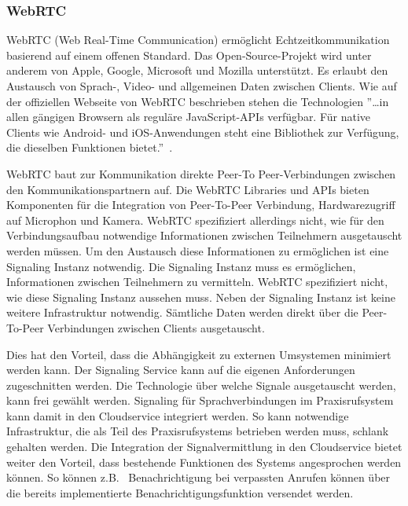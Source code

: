 \subsubsection{WebRTC}

WebRTC (Web Real-Time Communication) ermöglicht Echtzeitkommunikation basierend auf einem offenen Standard.
Das Open-Source-Projekt wird unter anderem von Apple, Google, Microsoft und Mozilla unterstützt.
Es erlaubt den Austausch von Sprach-, Video- und allgemeinen Daten zwischen Clients.
Wie auf der offiziellen Webseite von WebRTC beschrieben stehen die Technologien
''\ldots in allen gängigen Browsern als reguläre JavaScript-APIs verfügbar.
Für native Clients wie Android- und iOS-Anwendungen steht eine Bibliothek zur Verfügung, die dieselben Funktionen bietet.''~\cite{webrtc}.

WebRTC baut zur Kommunikation direkte Peer-To Peer-Verbindungen zwischen den Kommunikationspartnern auf.
Die WebRTC Libraries und APIs bieten Komponenten für die Integration von Peer-To-Peer Verbindung, Hardwarezugriff auf Microphon und Kamera.
WebRTC spezifiziert allerdings nicht, wie für den Verbindungsaufbau notwendige Informationen zwischen Teilnehmern ausgetauscht werden müssen.
Um den Austausch diese Informationen zu ermöglichen ist eine Signaling Instanz notwendig.
Die Signaling Instanz muss es ermöglichen, Informationen zwischen Teilnehmern zu vermitteln.
WebRTC spezifiziert nicht, wie diese Signaling Instanz aussehen muss.
Neben der Signaling Instanz ist keine weitere Infrastruktur notwendig.
Sämtliche Daten werden direkt über die Peer-To-Peer Verbindungen zwischen Clients ausgetauscht.

Dies hat den Vorteil, dass die Abhängigkeit zu externen Umsystemen minimiert werden kann.
Der Signaling Service kann auf die eigenen Anforderungen zugeschnitten werden.
Die Technologie über welche Signale ausgetauscht werden, kann frei gewählt werden.
Signaling für Sprachverbindungen im Praxisrufsystem kann damit in den Cloudservice integriert werden.
So kann notwendige Infrastruktur, die als Teil des Praxisrufsystems betrieben werden muss, schlank gehalten werden.
Die Integration der Signalvermittlung in den Cloudservice bietet weiter den Vorteil, dass bestehende Funktionen des Systems angesprochen werden können.
So können z.B. \ Benachrichtigung bei verpassten Anrufen können über die bereits implementierte Benachrichtigungsfunktion versendet werden.

